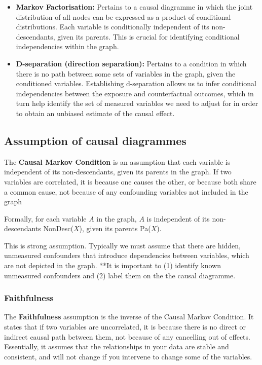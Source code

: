 \documentclass[
  singlecolumn]{report}
\begin{document}
\begin{itemize}
\item
  \textbf{Markov Factorisation:} Pertains to a causal diagramme in which
  the joint distribution of all nodes can be expressed as a product of
  conditional distributions. Each variable is conditionally independent
  of its non-descendants, given its parents. This is crucial for
  identifying conditional independencies within the graph.
\item
  \textbf{D-separation (direction separation):} Pertains to a condition
  in which there is no path between some sets of variables in the graph,
  given the conditioned variables. Establishing d-separation allows us
  to infer conditional independencies between the exposure and
  counterfactual outcomes, which in turn help identify the set of
  measured variables we need to adjust for in order to obtain an
  unbiased estimate of the causal effect.
\end{itemize}

\hypertarget{assumption-of-causal-diagrammes}{%
\subsection{Assumption of causal
diagrammes}\label{assumption-of-causal-diagrammes}}

The \textbf{Causal Markov Condition} is an assumption that each variable
is independent of its non-descendants, given its parents in the graph.
If two variables are correlated, it is because one causes the other, or
because both share a common cause, not because of any confounding
variables not included in the graph

Formally, for each variable \(A\) in the graph, \(A\) is independent of
its non-descendants NonDesc(\(X\)), given its parents Pa(\(X\)).

This is strong assumption. Typically we must assume that there are
hidden, unmeasured confounders that introduce dependencies between
variables, which are not depicted in the graph. **It is important to (1)
identify known unmeasured confounders and (2) label them on the the
causal diagramme.

\hypertarget{faithfulness}{%
\subsubsection{\texorpdfstring{\textbf{Faithfulness}}{Faithfulness}}\label{faithfulness}}

The \textbf{Faithfulness} assumption is the inverse of the Causal Markov
Condition. It states that if two variables are uncorrelated, it is
because there is no direct or indirect causal path between them, not
because of any cancelling out of effects. Essentially, it assumes that
the relationships in your data are stable and consistent, and will not
change if you intervene to change some of the variables.
\end{document}
